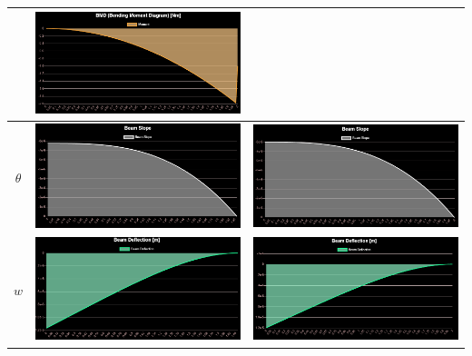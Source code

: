 \documentclass{jsarticle}
\begin{document}
\begin{table}[H]
\begin{center}
\begin{tabular}{|c|c|c|}
\begin{minipage}{6truecm}
\end{minipage}
&
\begin{minipage}{6truecm}
\centering
\includegraphics[width=6cm]{cantilever_distributed_model_FDM_bm.PNG}
\end{minipage}
\\
\hline
$\theta$ &
\begin{minipage}{6truecm}
\centering
\includegraphics[width=6cm]{cantilever_distributed_model_FEM_slo.PNG}
\end{minipage}
&
\begin{minipage}{6truecm}
\centering
\includegraphics[width=6cm]{cantilever_distributed_model_FDM_slo.PNG}
\end{minipage}
\\
\hline
$w$ &
\begin{minipage}{6truecm}
\centering
\includegraphics[width=6cm]{cantilever_distributed_model_FEM_def.PNG}
\end{minipage}
&
\begin{minipage}{6truecm}
\centering
\includegraphics[width=6cm]{cantilever_distributed_model_FDM_def.PNG}
\end{minipage}
\\
\hline
\end{tabular}
\end{center}
\end{table}
\end{document}
